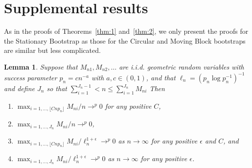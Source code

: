 \documentclass[11pt]{article}
\newtheorem{lem}{Lemma}
\theoremstyle{definition}
\begin{document}
\section{Supplemental results}
As in the proofs of Theorems~\ref{thm:1} and~\ref{thm:2}, we only
present the proofs for the Stationary Bootstrap as those for the
Circular and Moving Block bootstraps are similar but less complicated.

\begin{lem}\label{res:a1}
  Suppose that $M_{n1}, M_{n2},\dots$ are i.i.d. geometric random
  variables with success parameter $p_n = c n^{-a}$ with $a, c \in
  (0,1)$, and that $\ell_n = (p_n \log p_n^{-1})^{-1}$ and define
  $J_n$ so that $\sum_{i=1}^{J_n-1} < n \leq \sum_{i=1}^{J_n} M_{ni} $
  Then 
  \begin{enumerate}
  \item $\max_{i=1,\dots,\lfloor C n p_n \rfloor} M_{ni} / n \to^p 0$
    for any positive $C$,
  \item $\max_{i=1,\dots,J_n} M_{ni} / n \to^p 0$,
  \item $\max_{i=1,\dots,  \lfloor C n p_n \rfloor} M_{ni} /
  \ell_n^{1+\epsilon} \to^p 0$ as $n \to \infty$ for any positive
  $\epsilon$ and $C$, and
  \item $\max_{i=1,\dots,J_n} M_{ni} /
  \ell_n^{1+\epsilon} \to^p 0$ as $n \to \infty$ for any positive
  $\epsilon$.
  \end{enumerate}
\end{lem}
\end{document}

